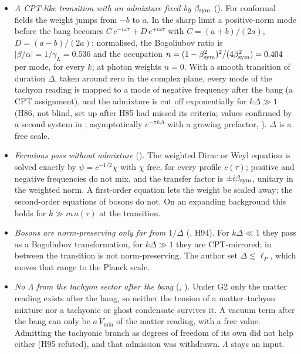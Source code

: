 \begin{itemize}
\item \emph{A CPT-like transition with an admixture fixed by $\beta_{\mathrm{sym}}$} (). For conformal fields the weight jumps
  from $-b$ to $a$. In the sharp limit a positive-norm mode before the bang becomes
  $C\,e^{-i\omega\tau}+D\,e^{+i\omega\tau}$ with $C=(a+b)/(2a)$, $D=(a-b)/(2a)$; normalised, the Bogoliubov ratio is
  $|\beta/\alpha|=1/\gamma_L=0.536$ and the occupation $n=(1-\beta_{\mathrm{sym}}^2)^2/(4\beta_{\mathrm{sym}}^2)=0.404$ per mode, for every $k$; at photon
  weights $n=0$. With a smooth transition of duration $\Delta$, taken around zero in the complex plane, every mode of the
  tachyon reading is mapped to a mode of negative frequency after the bang (a CPT assignment), and the admixture is cut
  off exponentially for $k\Delta\gg1$ (H86, not blind, set up after H85 had missed its criteria; values confirmed by a
  second system in ; asymptotically $e^{-\pi k\Delta}$ with a growing prefactor, ). $\Delta$ is a free scale.
\item \emph{Fermions pass without admixture} (). The weighted Dirac or Weyl equation is solved exactly by
  $\psi=c^{-1/2}\chi$ with $\chi$ free, for every profile $c(\tau)$; positive and negative frequencies do not mix, and the
  transfer factor is $\pm i\beta_{\mathrm{sym}}$, unitary in the weighted norm. A first-order equation lets the weight be scaled away; the
  second-order equations of bosons do not. On an expanding background this holds for $k\gg m\,a(\tau)$ at the transition.
\item \emph{Bosons are norm-preserving only far from $1/\Delta$} (, H94). For $k\Delta\ll1$ they pass as a
  Bogoliubov transformation, for $k\Delta\gg1$ they are CPT-mirrored; in between the transition is not norm-preserving.
  The author set $\Delta\lesssim\ell_P$, which moves that range to the Planck scale.
\item \emph{No $\Lambda$ from the tachyon sector after the bang} (, ). Under G2 only the matter reading
  exists after the bang, so neither the tension of a matter--tachyon mixture nor a tachyonic or ghost condensate survives
  it. A vacuum term after the bang can only be $a\,V_{\min}$ of the matter reading, with a free value. Admitting the
  tachyonic branch as degrees of freedom of its own did not help either (H95 refuted), and that admission was withdrawn.
  $\Lambda$ stays an input.
\end{itemize}

